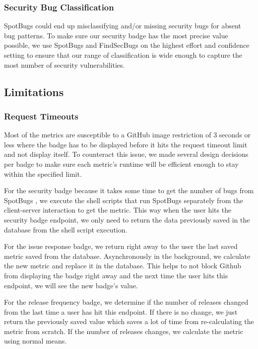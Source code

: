 \documentclass[12pt, letterpaper]{article}
\begin{document}
\subsubsection{Security Bug Classification}
SpotBugs \cite{spotbugs} could end up misclassifying and/or missing security bugs for absent bug patterns.
To make sure our security badge has the most precise value possible, we use SpotBugs \cite{spotbugs}
and FindSecBugs \cite{findsecbugs} on the highest effort and confidence setting to ensure that 
our range of classification is wide enough to capture the most number of security vulnerabilities.


\subsection{Limitations}
\subsubsection{Request Timeouts}
Most of the metrics are susceptible to a GitHub \cite{github} image restriction of 3 seconds or less
where the badge has to be displayed before it hits the request timeout limit and not display itself.
To counteract this issue, we made several design decisions per badge to make sure each metric's
runtime will be efficient enough to stay within the specified limit.


For the security badge because it takes some time to get the number of bugs from SpotBugs \cite{spotbugs},
we execute the shell scripts that run SpotBugs separately from the client-server interaction to get the metric.
This way when the user hits the security badge endpoint, we only need to return the data previously saved in the 
database from the shell script execution.


For the issue response badge, we return right away to the user the last saved metric saved from the database.
Asynchronously in the background, we calculate the new metric and replace it in the database.
This helps to not block Github from displaying the badge right away and the next time the user hits this endpoint,
we will see the new badge's value.


For the release frequency badge, we determine if the number of releases changed from the last time a user has 
hit this endpoint. If there is no change, we just return the previously saved value which saves a lot of time 
from re-calculating the metric from scratch. If the number of releases changes, we calculate the metric using 
normal means. 
\end{document}
